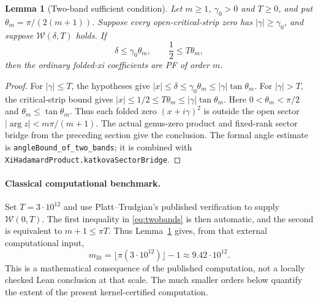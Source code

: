 \documentclass[11pt]{amsart}
\newtheorem{lemma}[theorem]{Lemma}
\begin{document}
\begin{lemma}[Two-band sufficient condition]\label{lem:twobands}
Let $m\ge1$, $\gamma_0>0$ and $T\ge0$, and put
$\theta_m=\pi/(2(m+1))$. Suppose every open-critical-strip zero has
$|\gamma|\ge\gamma_0$, and suppose $\mathcal W(\delta,T)$ holds. If
\begin{equation}\label{eq:twobands}
 \delta\le\gamma_0\theta_m,\qquad \frac12\le T\theta_m,
\end{equation}
then the ordinary folded-xi coefficients are PF of order $m$.
\end{lemma}
\begin{proof}
For $|\gamma|\le T$, the hypotheses give
$|x|\le\delta\le\gamma_0\theta_m\le|\gamma|\tan\theta_m$.
For $|\gamma|>T$, the critical-strip bound gives
$|x|\le1/2\le T\theta_m\le|\gamma|\tan\theta_m$.
Here $0<\theta_m<\pi/2$ and $\theta_m\le\tan\theta_m$.
Thus each folded zero $(x+i\gamma)^2$ is outside the open sector
$|\arg z|<m\pi/(m+1)$. The actual genus-zero product and fixed-rank sector
bridge from the preceding section give the conclusion.
The formal angle estimate is \texttt{angleBound\_of\_two\_bands}; it is
combined with \texttt{XiHadamardProduct.katkovaSectorBridge}.
\end{proof}

\paragraph{Classical computational benchmark.}
Set $T=3\cdot10^{12}$ and use Platt--Trudgian's published verification
\cite{platttrudgian} to supply $\mathcal W(0,T)$. The first inequality in
\eqref{eq:twobands} is then automatic, and the second is equivalent to
$m+1\le\pi T$. Thus Lemma~\ref{lem:twobands} gives, from that external
computational input,
\[
 m_{\mathrm{lit}}=\lfloor\pi(3\cdot10^{12})\rfloor-1
     \approx9.42\cdot10^{12}.
\]
This is a mathematical consequence of the published computation, not a
locally checked Lean conclusion at that scale. The much smaller orders
below quantify the extent of the present kernel-certified computation.
\end{document}
